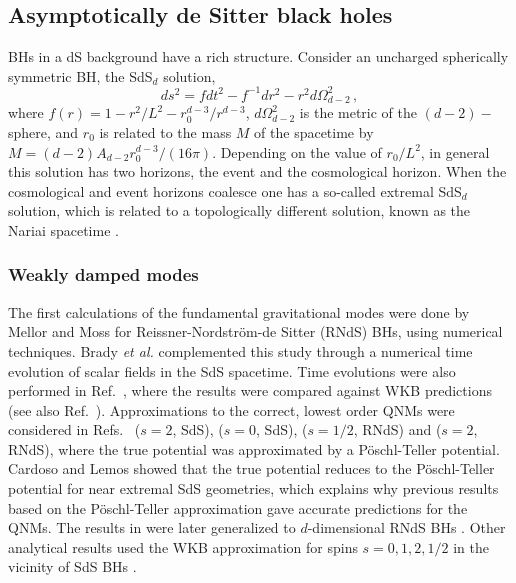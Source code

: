 \documentclass[]{iopart}
\def\be{\begin{equation}}
\def\ee{\end{equation}}
\begin{document}
\subsection{Asymptotically de Sitter black holes}
BHs in a dS background have a rich structure. Consider an uncharged
spherically symmetric BH, the SdS$_d$ solution,
%
\be ds^{2}= fdt^{2}- f^{-1}dr^{2}-r^{2}d\Omega_{d-2}^2\,, \ee
%
where $f(r)=1-r^{2}/L^2-r_0^{d-3}/r^{d-3}$, $d\Omega_{d-2}^2$ is the metric of
the $(d-2)-$sphere, and $r_0$ is related to the mass $M$ of the spacetime by
$M=(d-2)A_{d-2}r_0^{d-3}/(16\pi)$. Depending on the value of $r_0/L^2$, in general this solution has two horizons, the event and the
cosmological horizon. When the cosmological and event horizons coalesce one
has a so-called extremal SdS$_d$ solution, which is related to a topologically
different solution, known as the Nariai spacetime
\cite{Nariai1,Nariai2,Caldarelli:2000wc,Cardoso:2004uz}.

\subsubsection*{Weakly damped modes} The first calculations of the fundamental
gravitational modes were done by Mellor and Moss \cite{Mellor:1989ac} for
Reissner-Nordstr\"om-de Sitter (RNdS) BHs, using numerical techniques. Brady
{\it et al.} \cite{Brady:1999wd} complemented this study through a numerical
time evolution of scalar fields in the SdS spacetime. Time evolutions were
also performed in Ref.~\cite{Abdalla:2003db}, where the results were compared
against WKB predictions (see also Ref.~\cite{Konoplya:2007jv}). Approximations
to the correct, lowest order QNMs were considered in Refs.~\cite{Moss:2001ga}
($s=2$, SdS), \cite{Suneeta:2003bj} ($s=0$, SdS), \cite{Jing:2003wq} ($s=1/2$,
RNdS) and \cite{Jing:2005bh} ($s=2$, RNdS), where the true potential was
approximated by a P\"oschl-Teller potential. Cardoso and Lemos
\cite{Cardoso:2003sw} showed that the true potential reduces to the
P\"oschl-Teller potential for near extremal SdS geometries, which explains why
previous results based on the P\"oschl-Teller approximation gave accurate
predictions for the QNMs. The results in \cite{Cardoso:2003sw} were later
generalized to $d$-dimensional RNdS BHs \cite{Molina:2003ff}. Other analytical
results used the WKB approximation for spins $s=0,1,2,1/2$ in the vicinity
of SdS BHs \cite{Zhidenko:2003wq}.
\end{document}
